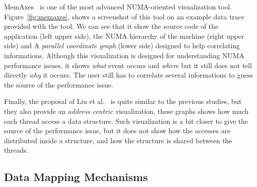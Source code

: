 MemAxes~\cite{Gimenez14Dissecting} is one of the most advanced NUMA-oriented
visualization tool.
Figure~\ref{fig:memaxes}, shows a screenshot of this tool on an example data
trace provided with the tool. We can see that it show the source code of the
application (left upper side), the NUMA hierarchy of the machine (right upper side)
and A \emph{parallel coordinate graph} (lower side) designed to  help correlating informations.
Although this visualization is designed for understanding NUMA performance
issues, it shows \emph{what} event occurs and \emph{where} but it still does not
tell directly \emph{why} it occurs. The user still has to correlate several
informations to guess the source of the performance issue.

Finally, the proposal of Liu et al.~\cite{Liu14Tool} is quite similar to the previous studies, but
they also provide an \emph{address centric} visualization, these graphs shows how
much each thread access a data structure. Such visualization is a bit closer
to give the source of the performance issue, but it does not show how the
accesses are distributed inside a structure, and how the structure is shared between
the threads.


\subsection{Data Mapping Mechanisms}
\label{sec:soa-mapping}

